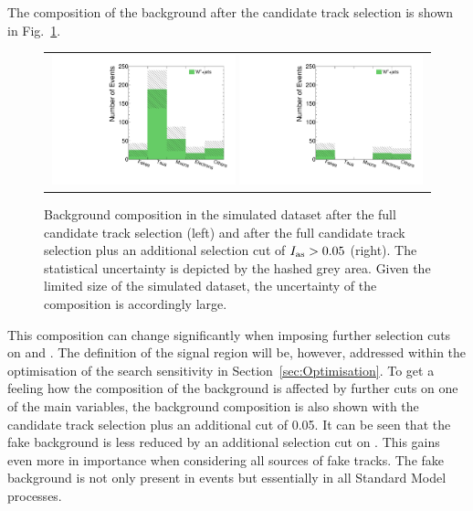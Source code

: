 The composition of the background after the candidate track selection is shown in Fig.~\ref{fig:BkgComposition}.
\begin{figure}[!bt]
  \centering 
  \begin{tabular}{c}
    \includegraphics[width=0.49\textwidth]{figures/analysis/AnalysisSelection/chiTracksfullSelectionTrigger_Wjets/htrackgenParticleSmallRange_lin.pdf}
    \includegraphics[width=0.49\textwidth]{figures/analysis/AnalysisSelection/chiTracksfullSelectionPlusIasTrigger_Wjets/htrackgenParticleSmallRange_lin.pdf}
  \end{tabular}
  \caption{Background composition in the simulated \WJets dataset after the full candidate track selection (left) and after the full candidate track selection plus an additional selection cut of \mbox{$I_{\text{as}}>0.05$} (right). 
           The statistical uncertainty is depicted by the hashed grey area.
           Given the limited size of the simulated \WJets dataset, the uncertainty of the composition is accordingly large.}
  \label{fig:BkgComposition}
\end{figure}
This composition can change significantly when imposing further selection cuts on \pt and \ias.
The definition of the signal region will be, however, addressed within the optimisation of the search sensitivity in Section~\ref{sec:Optimisation}.
To get a feeling how the composition of the background is affected by further cuts on one of the main variables, 
the background composition is also shown with the candidate track selection plus an additional \ias cut of 0.05.
It can be seen that the fake background is less reduced by an additional selection cut on \ias.
This gains even more in importance when considering all sources of fake tracks.
The fake background is not only present in \WJets events but essentially in all Standard Model processes.\\

